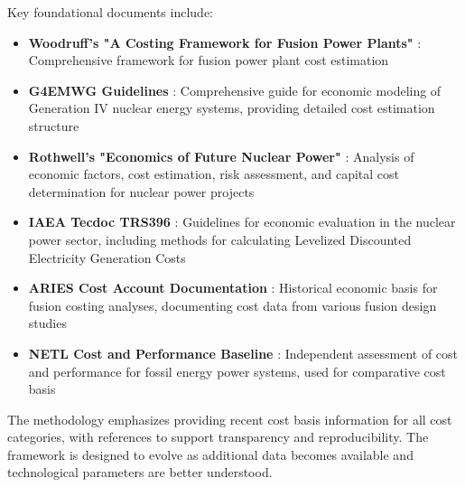 Key foundational documents include:
\begin{itemize}
    \item \textbf{Woodruff's "A Costing Framework for Fusion Power Plants"} \cite{Woodruff2026CostingFrameworkFusion}: Comprehensive framework for fusion power plant cost estimation
    \item \textbf{G4EMWG Guidelines} \cite{EMWGOGIIF2007}: Comprehensive guide for economic modeling of Generation IV nuclear energy systems, providing detailed cost estimation structure
    \item \textbf{Rothwell's "Economics of Future Nuclear Power"} \cite{Rothwell2015}: Analysis of economic factors, cost estimation, risk assessment, and capital cost determination for nuclear power projects
    \item \textbf{IAEA Tecdoc TRS396} \cite{Meyer2000}: Guidelines for economic evaluation in the nuclear power sector, including methods for calculating Levelized Discounted Electricity Generation Costs
    \item \textbf{ARIES Cost Account Documentation} \cite{Waganer2013}: Historical economic basis for fusion costing analyses, documenting cost data from various fusion design studies
    \item \textbf{NETL Cost and Performance Baseline} \cite{JamesCorrespondingAuthor2019}: Independent assessment of cost and performance for fossil energy power systems, used for comparative cost basis
\end{itemize}

The methodology emphasizes providing recent cost basis information for all cost categories, with references to support transparency and reproducibility. The framework is designed to evolve as additional data becomes available and technological parameters are better understood.\\

\newpage
